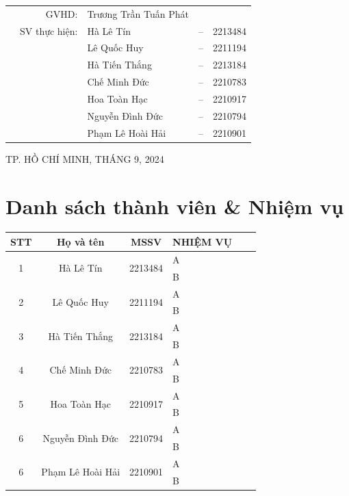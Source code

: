 \documentclass[a4paper]{article}
\begin{document}
\begin{titlepage}
	\begin{table}[h]
		\centering
		\begin{tabular}{rrlcl}
			\hspace{2.25 cm} & GVHD: & Trương Trần Tuấn Phát & & \\
			& SV thực hiện: & Hà Lê Tín   & -- & 2213484 \\
            & & Lê Quốc Huy & -- & 2211194\\
            & & Hà Tiến Thắng & -- & 2213184 \\
            & & Chế Minh Đức & -- & 2210783 \\
            & & Hoa Toàn Hạc & -- & 2210917 \\
            & & Nguyễn Đình Đức & -- & 2210794 \\
            & & Phạm Lê Hoài Hải & -- & 2210901 \\
		\end{tabular}
	\end{table}


\begin{center}
{\footnotesize TP. HỒ CHÍ MINH, THÁNG 9, 2024}
\end{center}
\end{titlepage}


\section*{Danh sách thành viên \& Nhiệm vụ }

\begin{center}
\begin{tabular}{|c|c|c|l|c|c|}
\hline
\textbf{STT} & \textbf{Họ và tên} & \textbf{MSSV} & \textbf{NHIỆM VỤ}\\
\hline 
\multirow{2}{*}{1} & \multirow{2}{*}{Hà Lê Tín} & \multirow{2}{*}{2213484} & A \\
 & &  & B\\
\hline 
\multirow{2}{*}{2} & \multirow{2}{*}{Lê Quốc Huy} & \multirow{2}{*}{2211194} & A \\
 & &  & B\\
\hline 
\multirow{2}{*}{3} & \multirow{2}{*}{Hà Tiến Thắng} & \multirow{2}{*}{2213184} & A \\
 & &  & B\\
\hline 
\multirow{2}{*}{4} & \multirow{2}{*}{Chế Minh Đức} & \multirow{2}{*}{2210783} & A \\
 & &  & B\\
\hline 
\multirow{2}{*}{5} & \multirow{2}{*}{Hoa Toàn Hạc} & \multirow{2}{*}{2210917} & A \\
 & &  & B\\
\hline
\multirow{2}{*}{6} & \multirow{2}{*}{Nguyễn Đình Đức} & \multirow{2}{*}{2210794} & A \\
 & &  & B\\
\hline 
\multirow{2}{*}{6} & \multirow{2}{*}{Phạm Lê Hoài Hải} & \multirow{2}{*}{2210901} & A \\
 & &  & B\\
\hline 
\end{tabular}
\end{center}
\newpage
\tableofcontents
\newpage
\end{document}

